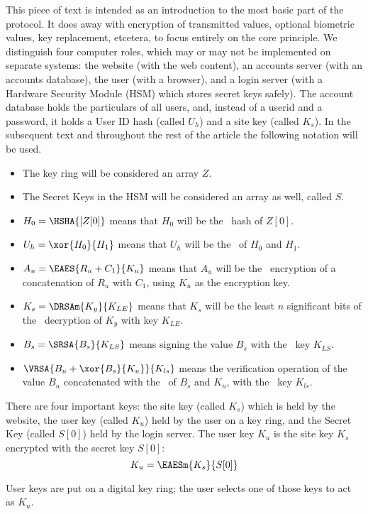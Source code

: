%
This piece of text is intended as an introduction to the most basic part of the protocol.
It does away with encryption of transmitted values, optional biometric values, key replacement, etcetera, to focus entirely on the core principle.
We distinguish four computer roles, which may or may not be implemented on separate systems:
the website
(with the web content),
an accounts server
(with an accounts database),
the user
(with a browser),
and a login server
(with a Hardware Security Module (HSM) which stores secret keys safely).
The account database holds the particulars of all users,
and,
instead of a userid and a password,
it holds a User ID hash
(called $U_h$)
and a site key
(called $K_s$).
In the subsequent text and throughout the rest of the article the following notation will be used.
\begin{itemize}
\item The key ring will be considered an array $Z$.
\item The Secret Keys in the HSM will be considered an array as well, called $S$.
\item \(H_0=\HSHA{[Z[0]}\) means that $H_0$ will be the \SHA\ hash of $Z[0]$.
\item \(U_h=\xor{H_0}{H_1}\) means that $U_h$ will be the \XOR\ of $H_0$ and $H_1$.
\item \(A_u=\EAES{R_u + C_1}{K_u}\) means that $A_u$ will be the \AES\ encryption of a concatenation of $R_u$ with $C_1$,
using $K_u$ as the encryption key.
\item \(K_s=\DRSAm{K_y}{K_{LE}}\) means that $K_s$ will be the least $n$ significant bits of the \RSA\ decryption of $K_y$ with key $K_{LE}$.
\item \(B_s=\SRSA{B_s}{K_{LS}}\) means signing the value $B_s$ with the \RSA\ key $K_{LS}$.
\item \(\VRSA{B_u+\xor{B_s}{K_u}}{K_{ls}}\) means the verification operation of the value $B_u$ concatenated with the \XOR\ of $B_s$ and $K_u$, with the \RSA\ key $K_{ls}$.
\end{itemize}
There are four important keys:
the site key
(called $K_s$) which is held by the website,
the user key
(called $K_u$) held by the user on a key ring,
and the Secret Key
(called $S[0]$) held by the login server.
The user key $K_u$ is the site key $K_s$ encrypted with the secret key $S[0]$:
\[K_u=\EAESm{K_s}{S[0]}\]
\par
User keys are put on a digital key ring;
the user selects one of those keys to act as $K_u$.
